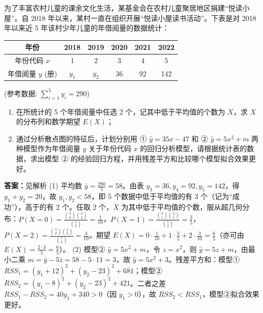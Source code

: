 \begin{problem}
为了丰富农村儿童的课余文化生活，某基金会在农村儿童聚居地区捐建“悦读小屋”。自 2018 年以来，某村一直在组织开展“悦读小屋读书活动”。下表是对 2018 年以来近 5 年该村少年儿童的年借阅量的数据统计：

\begin{tabular}{|c|c|c|c|c|c|}
\hline
年份 & 2018 & 2019 & 2020 & 2021 & 2022\\
\hline
年份代码 $x$ & 1 & 2 & 3 & 4 & 5\\
\hline
年借阅量 $y$ (册) & $y_1$ & $y_2$ & 36 & 92 & 142\\
\hline
\end{tabular}

(参考数据: $\sum_{i=1}^{5} y_i = 290$)

\begin{enumerate}
\item 在所统计的 5 个年借阅量中任选 2 个，记其中低于平均值的个数为 $X$，求 $X$ 的分布列和数学期望 $E(X)$；
\item 通过分析散点图的特征后，计划分别用 ① $\hat{y} = 35x - 47$ 和 ② $\hat{y} = 5x^2 + m$ 两种模型作为年借阅量 $y$ 关于年份代码 $x$ 的回归分析模型，请根据统计表的数据，求出模型 ② 的经验回归方程，并用残差平方和比较哪个模型拟合效果更好。
\end{enumerate}
\begin{solution}
\textbf{答案：}见解析
(1) 平均数 $\bar y=\frac{290}{5}=58$。由表 $y_3=36,y_4=92,y_5=142$，得 $y_1+y_2=20$，故 $y_1,y_2<58$，即 5 个数据中低于平均值的有 3 个（记为“成功”），高于的有 2 个。任取 2 个，$X$ 为其中低于平均值的个数，服从超几何分布：$P(X=0)=\frac{\binom30\binom22}{\binom52}=\frac1{10}$，$P(X=1)=\frac{\binom31\binom21}{\binom52}=\frac35$，$P(X=2)=\frac{\binom32\binom20}{\binom52}=\frac3{10}$。期望 $E(X)=0\cdot\frac1{10}+1\cdot\frac35+2\cdot\frac3{10}=\frac65$（亦可由 $E(X)=\frac{2\cdot3}{5}=\frac65$）。
(2) 模型② $\hat y=5x^2+m$，令 $z=x^2$，则 $\hat y=5z+m$，由最小二乘 $m=\bar y-5\bar z=58-5\cdot11=3$，故 $\hat y=5x^2+3$。残差平方和：模型① $RSS_1=(y_1+12)^2+(y_2-23)^2+681$；模型② $RSS_2=(y_1-8)^2+(y_2-23)^2+421$。二者之差 $RSS_1-RSS_2=40y_1+340>0$（因 $y_1>0$），故 $RSS_2<RSS_1$，模型②拟合效果更好。
\end{solution}
\end{problem}

